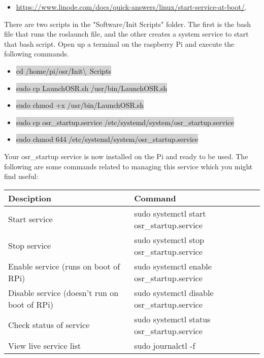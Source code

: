 \documentclass{article}
\begin{document}
\begin{itemize}
	\item \href{https://www.linode.com/docs/quick-answers/linux/start-service-at-boot/}{https://www.linode.com/docs/quick-answers/linux/start-service-at-boot/}. 
\end{itemize}

There are two scripts in the "Software/Init Scripts" folder. The first is the bash file that runs the roslaunch file, and the other creates a system service to start that bash script. Open up a terminal on the raspberry Pi and execute the following commands.

\begin{itemize}
	\item[] \colorbox{lightgray}{cd /home/pi/osr/Init\textbackslash\ Scripts}
	\item[] \colorbox{lightgray}{sudo cp LaunchOSR.sh /usr/bin/LaunchOSR.sh}
	\item[] \colorbox{lightgray}{sudo chmod +x /usr/bin/LaunchOSR.sh}
	\item[] \colorbox{lightgray}{sudo cp osr\_startup.service /etc/systemd/system/osr\_startup.service}
	\item[] \colorbox{lightgray}{sudo chmod 644 /etc/systemd/system/osr\_startup.service}
\end{itemize}

\noindent Your osr\_startup service is now installed on the Pi and ready to be used. The following are some commands related to managing this service which you might find useful:

\begin{table}[H]
	\centering
		\begin{tabular}{| l | l |}
		\hline
		\textbf{Desciption} & \textbf{Command} \\ \hline
		Start service & sudo systemctl start osr\_startup.service \\ \hline
		Stop service & sudo systemctl stop osr\_startup.service \\ \hline
		Enable service (runs on boot of RPi) & sudo systemctl enable osr\_startup.service \\ \hline
		Disable service (doesn't run on boot of RPi) & sudo systemctl disable osr\_startup.service \\ \hline
		Check status of service & sudo systemctl status osr\_startup.service \\ \hline
		View live service list & sudo journalctl -f \\ \hline
		\end{tabular}
\end{table}
\end{document}
